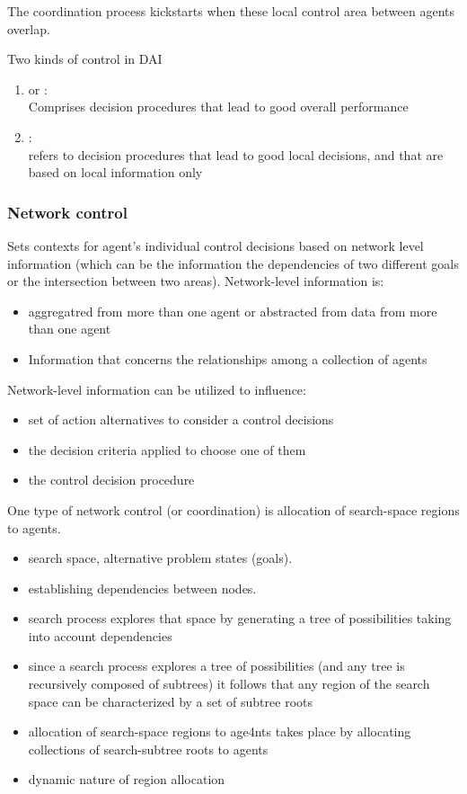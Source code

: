 The coordination process kickstarts when these local control area between agents overlap. 

Two kinds of control in DAI
\begin{enumerate}
\item {} or :\\
Comprises decision procedures that lead to good overall performance
\item {}:\\
refers to decision procedures that lead to good local decisions, and that are based on local information only
\end{enumerate}

\subsubsection{Network control}
Sets contexts for agent's individual control decisions based on network level information (which can be the information the dependencies of two different goals or the intersection between two areas).
Network-level information is:
\begin{itemize}
\item aggregatred from more than one agent or abstracted from data from more than one agent
\item Information that concerns the relationships among a collection of agents
\end{itemize}
Network-level information can be utilized to influence:
\begin{itemize}
\item set of action alternatives to consider a control decisions
\item the decision criteria applied to choose one of them
\item  the control decision procedure
\end{itemize}

One type of network control (or coordination) is allocation of search-space regions to agents. 
\begin{itemize}
\item search space, alternative problem states (goals).
\item establishing dependencies between nodes.
\item search process explores that space by generating a tree of possibilities taking into account dependencies
\item since a search process explores a tree of possibilities (and any tree is recursively composed of subtrees) it follows that any region of the search space can be characterized by a set of subtree roots
\item allocation of search-space regions to age4nts takes place by allocating collections of search-subtree roots to agents
\item dynamic nature of region allocation
\end{itemize}


